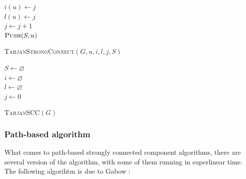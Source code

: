 \documentclass[english]{tktltiki2}
\theoremstyle{definition}
\theoremstyle{remark}
\begin{document}
\begin{algorithm}
$i(u) \leftarrow j$ \\
$l(u) \leftarrow j$ \\
$j \leftarrow j + 1$ \\
$\textsc{Push}(S, u)$ \\
\caption{\textsc{TarjanStrongConnect}$(G, u, i, l, j, S)$}
\label{alg:tarjan_strong_connect}
\end{algorithm}

\begin{algorithm}
$S \leftarrow \varnothing$ \\
$i \leftarrow \varnothing$ \\
$l \leftarrow \varnothing$ \\
$j \leftarrow 0$ \\
\caption{\textsc{TarjanSCC}$(G)$}
\label{alg:tarjan}
\end{algorithm}

\subsubsection{Path-based algorithm}
What comes to path-based strongly connected component algorithms, there are several version of the algorithm, with some of them running in superlinear time. The following algorihtm is due to Gabow \cite{Gabow2000}:
\end{document}
